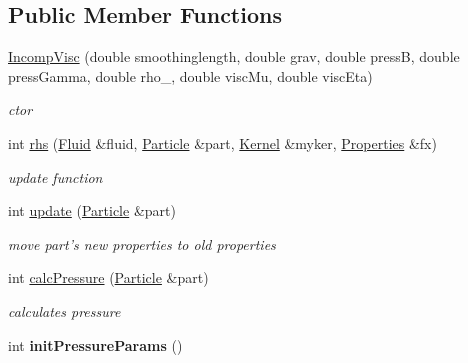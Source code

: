 \subsection*{\-Public \-Member \-Functions}
\begin{DoxyCompactItemize}
\item 
\hyperlink{classIncompVisc_a30ec80f360669cb6549710bc6d8b1571}{\-Incomp\-Visc} (double smoothinglength, double grav, double press\-B, double press\-Gamma, double rho\-\_, double visc\-Mu, double visc\-Eta)
\begin{DoxyCompactList}\small\item\em ctor \end{DoxyCompactList}\item 
int \hyperlink{classIncompVisc_a937b901289ff887f072c36b66e9360e8}{rhs} (\hyperlink{classFluid}{\-Fluid} \&fluid, \hyperlink{classParticle}{\-Particle} \&part, \hyperlink{classKernel}{\-Kernel} \&myker, \hyperlink{structProperties}{\-Properties} \&fx)
\begin{DoxyCompactList}\small\item\em update function \end{DoxyCompactList}\item 
\hypertarget{classIncompVisc_a21d2b01dfc8239e08970a94726c016e3}{int \hyperlink{classIncompVisc_a21d2b01dfc8239e08970a94726c016e3}{update} (\hyperlink{classParticle}{\-Particle} \&part)}\label{classIncompVisc_a21d2b01dfc8239e08970a94726c016e3}

\begin{DoxyCompactList}\small\item\em move part's new properties to old properties \end{DoxyCompactList}\item 
\hypertarget{classIncompVisc_a507655c39e5e76e18bd8bd422879984e}{int \hyperlink{classIncompVisc_a507655c39e5e76e18bd8bd422879984e}{calc\-Pressure} (\hyperlink{classParticle}{\-Particle} \&part)}\label{classIncompVisc_a507655c39e5e76e18bd8bd422879984e}

\begin{DoxyCompactList}\small\item\em calculates pressure \end{DoxyCompactList}\item 
\hypertarget{classIncompVisc_a63138bdbcda1877e621027d271848ba6}{int {\bfseries init\-Pressure\-Params} ()}\label{classIncompVisc_a63138bdbcda1877e621027d271848ba6}

\end{DoxyCompactItemize}


